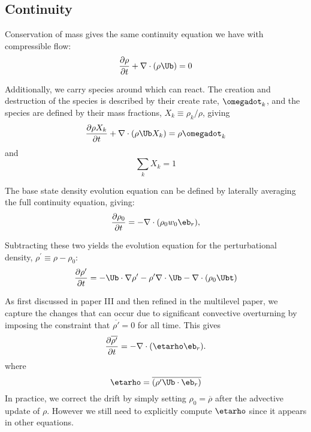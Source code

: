 \subsection{Continuity}

Conservation of mass gives the same continuity equation we have with
compressible flow:
\begin{equation}
\frac{\partial \rho}{\partial t} + \nabla \cdot (\rho \Ub) = 0
\label{eq:flow:continuity}
\end{equation}

Additionally, we carry species around which can react.  The creation and destruction
of the species is described by their create rate, $\omegadot_k$, and the species
are defined by their mass fractions, $X_k \equiv \rho_k / \rho$, giving
\begin{equation}
\frac{\partial \rho X_k}{\partial t} + \nabla \cdot (\rho \Ub X_k) = \rho \omegadot_k
\end{equation}
and
\begin{equation}
\sum_k X_k = 1
\end{equation}

The base state density evolution equation can be defined by laterally averaging the 
full continuity equation, giving:
\begin{equation}
\frac{\partial\rho_0}{\partial t} = -\nabla\cdot(\rho_0 w_0 \eb_r),\label{eq:flow:base_density}
\end{equation}

Subtracting these two yields the evolution equation for the perturbational
density, $\rho^\prime \equiv \rho - \rho_0$:
\begin{equation}
\frac{\partial\rho'}{\partial t} = -\Ub\cdot\nabla\rho' -
  \rho'\nabla\cdot\Ub - \nabla\cdot\left(\rho_0\Ubt\right) \label{eq:flow:rhoprime}
\end{equation}

As first discussed in paper III and then refined in the multilevel paper, we capture
the changes that can occur due to significant convective
overturning by imposing the constraint that $\overline{\rho'}=0$
for all time.  This gives
\begin{equation}
\frac{\partial\overline{\rho'}}{\partial t} = -\nabla\cdot(\etarho\eb_r).
\end{equation}
where
\begin{equation}
\etarho = \overline{\left(\rho'\Ub\cdot\eb_r\right)}
\end{equation}
In practice, we correct the drift by simply setting $\rho_0 =
\overline{\rho}$ after the advective update of $\rho$.  However we still need to
explicitly compute $\etarho$ since it appears in other equations.



